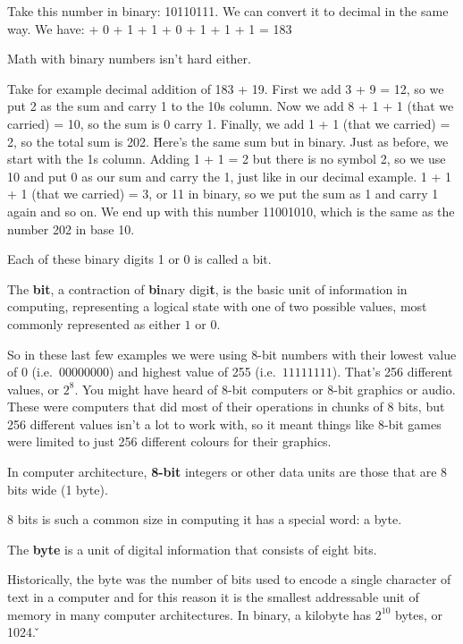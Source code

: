 \be
Take this number in binary: 10110111. We can convert it to decimal in the same way. We have:
 + 0 + 1 + 1 + 0 + 1 +
1 + 1 = 183
\ese
\ee

Math with binary numbers isn't hard either.

\be
Take for example decimal addition of 183 + 19. First we add 3 + 9 = 12, so we put 2 as the sum and carry 1 to the 10s
column. Now we add 8 + 1 + 1 (that we carried) = 10, so the sum is 0 carry 1. Finally, we add 1 + 1 (that we carried)
= 2, so the total sum is 202. \v

Here's the same sum but in binary. Just as before, we start with the 1s column. Adding 1 + 1 = 2 but there is no
symbol 2, so we use 10 and put 0 as our sum and carry the 1, just like in our decimal example. 1 + 1 + 1 (that we
carried) = 3, or 11 in binary, so we put the sum as 1 and carry 1 again and so on. We end up with this number
11001010, which is the same as the number 202 in base 10.
\ee

Each of these binary digits 1 or 0 is called a bit.

\bd[Bit]
The \textbf{bit}, a contraction of \textbf{bi}nary digi\textbf{t}, is the basic unit of information in computing,
representing a logical state with one of two possible values, most commonly represented as either $1$ or $0$.
\ed

So in these last few examples we were using 8-bit numbers with their lowest value of 0 (i.e.\ $00000000$) and highest
value of 255 (i.e.\ $11111111$). That's 256 different values, or $2^8$. You might have heard of 8-bit computers or
8-bit graphics or audio. These were computers that did most of their operations in chunks of 8 bits, but 256
different values isn't a lot to work with, so it meant things like 8-bit games were limited to just 256 different
colours for their graphics.

\bd[8-bit]
In computer architecture, \textbf{8-bit} integers or other data units are those that are 8 bits wide (1 byte).
\ed

8 bits is such a common size in computing it has a special word: a byte.

\bd[Byte]
The \textbf{byte} is a unit of digital information that consists of eight bits.
\ed

Historically, the byte was the number of bits used to encode a single character of text in a computer and for this
reason it is the smallest addressable unit of memory in many computer architectures. In binary, a kilobyte has
$2^{10}$ bytes, or 1024. \v

